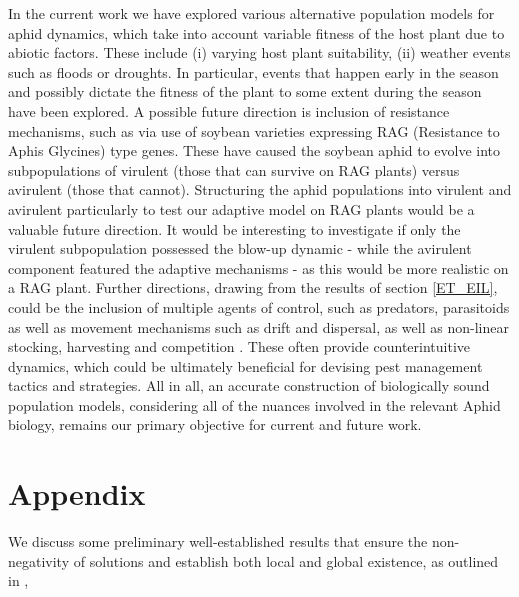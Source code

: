 \documentclass[sn-mathphys-num]{sn-jnl}
\numberwithin{equation}{section}
\numberwithin{equation}{section}
\begin{document}
 In the current work we have explored various alternative population models for aphid dynamics, which take into account variable fitness of the host plant due to abiotic factors. These include (i) varying host plant suitability, (ii) weather events such as floods or droughts. In particular, events that happen early in the season and possibly dictate the fitness of the plant to some extent during the season have been explored. A possible future direction is inclusion of resistance mechanisms, such as via use of soybean varieties expressing RAG (Resistance to Aphis Glycines) type genes. These have caused the soybean aphid to evolve into subpopulations of virulent (those that can survive on RAG plants) versus avirulent (those that cannot). Structuring the aphid populations into virulent and avirulent particularly to test our adaptive model on RAG plants would be a valuable future direction. It would be interesting to investigate if only the virulent subpopulation possessed the blow-up dynamic - while the avirulent component featured the adaptive mechanisms - as this would be more realistic on a RAG plant. Further directions, drawing from the results of section \ref{ET_EIL}, could be the inclusion of multiple agents of control, such as predators, parasitoids as well as movement mechanisms such as drift and dispersal, as well as non-linear stocking, harvesting and competition \cite{verma2023t, verma2025towards, banerjee2025two, parshad2021some}. These often provide counterintuitive dynamics, which could be ultimately beneficial for devising pest management tactics and strategies. 
All in all, an accurate construction of biologically sound population models, considering all of the nuances involved in the relevant Aphid biology, remains our primary objective for current and future work.


\section{Appendix}
We discuss some preliminary well-established results that ensure the non-negativity of solutions and establish both local and global existence, as outlined in \cite{MP10, Hen84},
\end{document}
